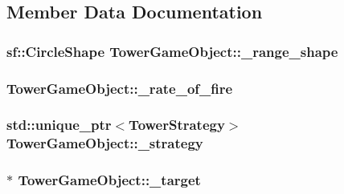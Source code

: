 \subsection{Member Data Documentation}
\hypertarget{class_tower_game_object_a3c154fe0b6a056540332b0c40d60304f}{
\subsubsection[{\+\_\+range\+\_\+shape}]{\setlength{\rightskip}{0pt plus 5cm}sf\+::\+Circle\+Shape Tower\+Game\+Object\+::\+\_\+range\+\_\+shape\hspace{0.3cm}{\ttfamily [protected]}}}\label{class_tower_game_object_a3c154fe0b6a056540332b0c40d60304f}
\hypertarget{class_tower_game_object_a791d99099306673e85ed6b93fd6f7b1b}{
\subsubsection[{\+\_\+rate\+\_\+of\+\_\+fire}]{ Tower\+Game\+Object\+::\+\_\+rate\+\_\+of\+\_\+fire\hspace{0.3cm}{\ttfamily [protected]}}}\label{class_tower_game_object_a791d99099306673e85ed6b93fd6f7b1b}
\hypertarget{class_tower_game_object_aa9eaa9739981280ef9ecebc0d5158205}{
\subsubsection[{\+\_\+strategy}]{\setlength{\rightskip}{0pt plus 5cm}std\+::unique\+\_\+ptr$<${\bf Tower\+Strategy}$>$ Tower\+Game\+Object\+::\+\_\+strategy\hspace{0.3cm}{\ttfamily [protected]}}}\label{class_tower_game_object_aa9eaa9739981280ef9ecebc0d5158205}
\hypertarget{class_tower_game_object_a6709e0f4ef86d852d98280a37dbc77bd}{
\subsubsection[{\+\_\+target}]{$\ast$ Tower\+Game\+Object\+::\+\_\+target\hspace{0.3cm}{\ttfamily [protected]}}}\label{class_tower_game_object_a6709e0f4ef86d852d98280a37dbc77bd}
